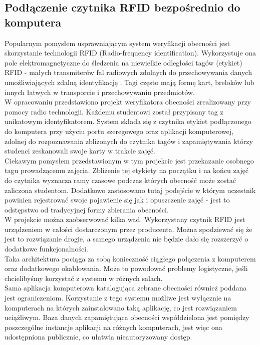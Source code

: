 \documentclass[declaration,shortabstract, mgr]{iithesis}
\begin{document}
\subsection{Podłączenie czytnika RFID bezpośrednio do komputera}
\indent Popularnym pomysłem usprawniającym system weryfikacji obecności jest skorzystanie technologii RFID (Radio-frequency identification). Wykorzystuje ona pole elektromagnetyczne do śledzenia na niewielkie odległości tagów (etykiet) RFID - małych transmiterów fal radiowych zdolnych do przechowywania danych umożliwiających zdalną identyfikację \cite{rfid_itself}. Tagi często mają formę kart, breloków lub innych łatwych w transporcie i przechowywaniu przedmiotów.\\
\indent W opracowaniu \cite{rfid_serial} przedstawiono projekt weryfikatora obecności zrealizowany przy pomocy radio technologii. Każdemu studentowi został przypisany tag z unikatowym identyfikatorem. System składa się z czytnika etykiet podłączonego do komputera przy użyciu portu szeregowego oraz aplikacji komputerowej, zdolnej do rozpoznawania zbliżonych do czytnika tagów i zapamiętywania którzy studenci zeskanowali swoje karty w trakcie zajęć. \\
\indent Ciekawym pomysłem przedstawionym w tym projekcie jest przekazanie osobnego tagu prowadzącemu zajęcia. Zbliżenie tej etykiety na początku i na końcu zajęć do czytnika wyznacza ramy czasowe podczas których obecność może zostać zaliczona studentom. Dodatkowo zastosowano tutaj podejście w którym uczestnik powinien rejestrować swoje pojawienie się jak i opuszczenie zajęć - jest to odstępstwo od tradycyjnej formy zbierania obecności. \\
\indent W projekcie można zaobserwować kilka wad. Wykorzystany czytnik RFID jest urządzeniem w całości dostarczonym przez producenta. Można spodziewać się że jest to rozwiązanie drogie, a samego urządzenia nie będzie dało się rozszerzyć o dodatkowe funkcjonalności. \\
\indent Taka architektura pociąga za sobą konieczność ciągłego połączenia z komputerem oraz dodatkowego okablowania. Może to powodować problemy logistyczne, jeśli chcielibyśmy korzystać z systemu w różnych salach.\\
\indent Sama aplikacja komputerowa katalogująca zebrane obecności również poddana jest ograniczeniom. Korzystanie z tego systemu możliwe jest wyłącznie na komputerach na których zainstalowano taką aplikację, co jest rozwiązaniem uciążliwym. Baza danych zapamiętująca obecności współdzielona jest pomiędzy poszczególne instancje aplikacji na różnych komputerach, jest więc ona udostępniona publicznie, co ułatwia nieautoryzowany dostęp.
\end{document}
